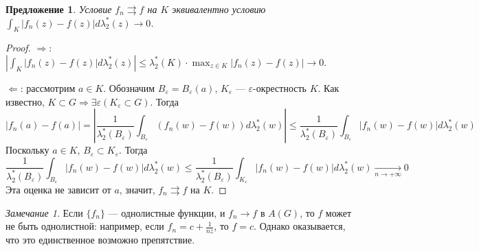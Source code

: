 \documentclass[12pt]{article}
\newcommand{\Ra}{\Rightarrow}
\newcommand{\La}{\Leftarrow}
\newcounter{cnt}
\theoremstyle{thmnote}
\newtheorem{proposition}[cnt]{Предложение}
\theoremstyle{remark}
\newtheorem*{remark}{Замечание}
\theoremstyle{defnote}
\begin{document}
\begin{proposition}
    Условие $f_n \rightrightarrows f$ на $K$ эквивалентно условию $\int_K |f_n(z) - f(z)| d \lambda_2^*(z) \to 0$.
\end{proposition}
\begin{proof}
    $\Ra$: $\left| \int_K |f_n(z) - f(z)| d \lambda_2^*(z) \right| \leq \lambda_2^*(K) \cdot \max_{z \in K} |f_n(z) - f(z)| \to 0$.

    $\La$: рассмотрим $a \in K$. Обозначим $B_\varepsilon = B_\varepsilon(a)$, $K_\varepsilon$ --- $\varepsilon$-окрестность $K$. Как известно, $K \subset G \Ra \exists \varepsilon (K_\varepsilon \subset G)$. Тогда
    \begin{equation*}
        |f_n(a) - f(a)| = \left| \frac{1}{\lambda_2^*(B_\varepsilon)} \int_{B_\varepsilon} (f_n(w) - f(w)) d \lambda_2^*(w) \right| \leq \frac{1}{\lambda_2^*(B_\varepsilon)} \int_{B_\varepsilon} |f_n(w) - f(w)| d \lambda_2^*(w)
    \end{equation*}
    Поскольку $a \in K$, $B_\varepsilon \subset K_\varepsilon$. Тогда
    \begin{equation*}
        \frac{1}{\lambda_2^*(B_\varepsilon)} \int_{B_\varepsilon} |f_n(w) - f(w)| d \lambda_2^*(w) \leq \frac{1}{\lambda_2^*(B_\varepsilon)} \int_{K_\varepsilon} |f_n(w) - f(w)| d \lambda_2^*(w) \underset{n \to +\infty}{\longrightarrow} 0
    \end{equation*}
    Эта оценка не зависит от $a$, значит, $f_n \rightrightarrows f$ на $K$.
\end{proof}

\begin{remark}
    Если $\{f_n\}$ --- однолистные функции, и $f_n \to f$ в $A(G)$, то $f$ может не быть однолистной: например, если $f_n = c + \frac{1}{n z}$, то $f = c$. Однако оказывается, что это единственное возможно препятствие.
\end{remark}
\end{document}
